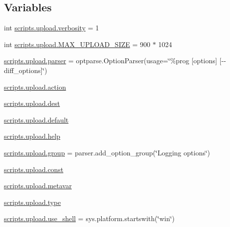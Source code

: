 \subsection*{Variables}
\begin{DoxyCompactItemize}
\item 
int \mbox{\hyperlink{namespacescripts_1_1upload_ad796267f5474bd4ecb2340549183480e}{scripts.\+upload.\+verbosity}} = 1
\item 
int \mbox{\hyperlink{namespacescripts_1_1upload_a87d1d592fd09521b1dc0fff8cf080c96}{scripts.\+upload.\+M\+A\+X\+\_\+\+U\+P\+L\+O\+A\+D\+\_\+\+S\+I\+ZE}} = 900 $\ast$ 1024
\item 
\mbox{\hyperlink{namespacescripts_1_1upload_aa49201163d7cbea0db55861903694370}{scripts.\+upload.\+parser}} = optparse.\+Option\+Parser(usage=\char`\"{}\%prog \mbox{[}options\mbox{]} \mbox{[}-\/-\/ diff\+\_\+options\mbox{]}\char`\"{})
\item 
\mbox{\hyperlink{namespacescripts_1_1upload_ab215d540c43641994b47b7d4f8d12dcb}{scripts.\+upload.\+action}}
\item 
\mbox{\hyperlink{namespacescripts_1_1upload_a684253eb5f5938ed90dba2689eda8f4d}{scripts.\+upload.\+dest}}
\item 
\mbox{\hyperlink{namespacescripts_1_1upload_a1304ed7f9ca366a2bb4dc019ddb4f11d}{scripts.\+upload.\+default}}
\item 
\mbox{\hyperlink{namespacescripts_1_1upload_a25ad48af346163077433fa24fad2e236}{scripts.\+upload.\+help}}
\item 
\mbox{\hyperlink{namespacescripts_1_1upload_adc5ba0e8d7e2c1b578070553971d679e}{scripts.\+upload.\+group}} = parser.\+add\+\_\+option\+\_\+group(\char`\"{}Logging options\char`\"{})
\item 
\mbox{\hyperlink{namespacescripts_1_1upload_a62d33e2f0caa68336feaa59dd99f2d3c}{scripts.\+upload.\+const}}
\item 
\mbox{\hyperlink{namespacescripts_1_1upload_a85221d2476e316b12fd497c7de91a4dd}{scripts.\+upload.\+metavar}}
\item 
\mbox{\hyperlink{namespacescripts_1_1upload_a8765ee3797ad0b3e9800efac4482c163}{scripts.\+upload.\+type}}
\item 
\mbox{\hyperlink{namespacescripts_1_1upload_ae685fc674282df1d7dde083a8a1977eb}{scripts.\+upload.\+use\+\_\+shell}} = sys.\+platform.\+startswith(\char`\"{}win\char`\"{})
\end{DoxyCompactItemize}
